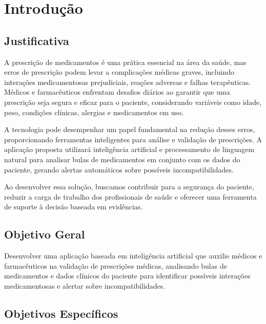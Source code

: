 \chapter{Introdução}

\section{Justificativa}

A prescrição de medicamentos é uma prática essencial na área da saúde, mas erros de prescrição podem levar a complicações médicas graves, incluindo interações medicamentosas prejudiciais, reações adversas e falhas terapêuticas. Médicos e farmacêuticos enfrentam desafios diários ao garantir que uma prescrição seja segura e eficaz para o paciente, considerando variáveis como idade, peso, condições clínicas, alergias e medicamentos em uso.

A tecnologia pode desempenhar um papel fundamental na redução desses erros, proporcionando ferramentas inteligentes para análise e validação de prescrições. A aplicação proposta utilizará inteligência artificial e processamento de linguagem natural para analisar bulas de medicamentos em conjunto com os dados do paciente, gerando alertas automáticos sobre possíveis incompatibilidades.

Ao desenvolver essa solução, buscamos contribuir para a segurança do paciente, reduzir a carga de trabalho dos profissionais de saúde e oferecer uma ferramenta de suporte à decisão baseada em evidências.

\section{Objetivo Geral}

Desenvolver uma aplicação baseada em inteligência artificial que auxilie médicos e farmacêuticos na validação de prescrições médicas, analisando bulas de medicamentos e dados clínicos do paciente para identificar possíveis interações medicamentosas e alertar sobre incompatibilidades.

\section{Objetivos Específicos}

